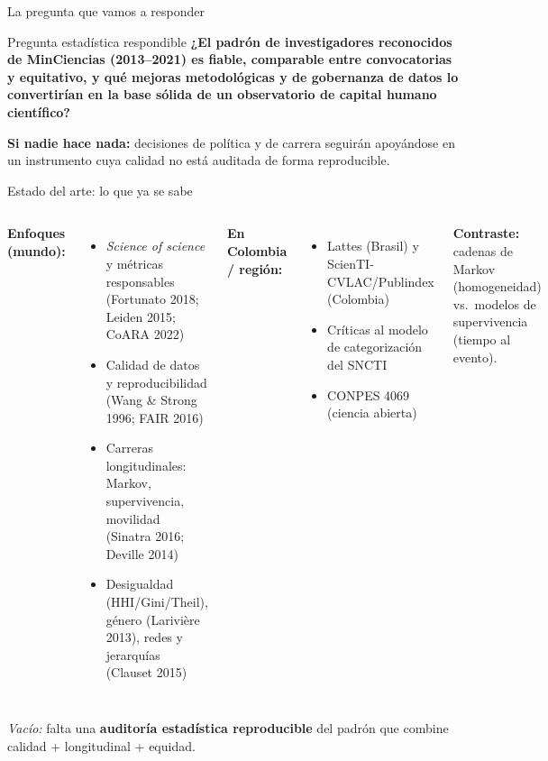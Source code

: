 \documentclass[10pt,aspectratio=169]{beamer}
\begin{document}
\begin{frame}{La pregunta que vamos a responder}
\begin{block}{Pregunta estadística respondible}
\textbf{¿El padrón de investigadores reconocidos de MinCiencias (2013--2021) es fiable, comparable entre convocatorias y equitativo, y qué mejoras metodológicas y de gobernanza de datos lo convertirían en la base sólida de un observatorio de capital humano científico?}
\end{block}
\vspace{3mm}
\textbf{Si nadie hace nada:} decisiones de política y de carrera seguirán apoyándose en un instrumento cuya calidad no está auditada de forma reproducible.
\end{frame}

\begin{frame}{Estado del arte: lo que ya se sabe}
\begin{columns}[T]
\textbf{Enfoques (mundo):}
\begin{itemize}
  \item \emph{Science of science} y métricas responsables (Fortunato 2018; Leiden 2015; CoARA 2022)
  \item Calidad de datos y reproducibilidad (Wang \& Strong 1996; FAIR 2016)
  \item Carreras longitudinales: Markov, supervivencia, movilidad (Sinatra 2016; Deville 2014)
  \item Desigualdad (HHI/Gini/Theil), género (Larivière 2013), redes y jerarquías (Clauset 2015)
\end{itemize}
\textbf{En Colombia / región:}
\begin{itemize}
  \item Lattes (Brasil) y ScienTI-CVLAC/Publindex (Colombia)
  \item Críticas al modelo de categorización del SNCTI
  \item CONPES 4069 (ciencia abierta)
\end{itemize}
\vspace{1mm}
\textbf{Contraste:} cadenas de Markov (homogeneidad) vs.\ modelos de supervivencia (tiempo al evento).
\end{columns}
\vspace{2mm}
\emph{Vacío:} falta una \textbf{auditoría estadística reproducible} del padrón que combine calidad + longitudinal + equidad.
\end{frame}
\end{document}
